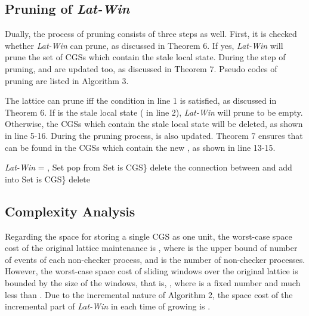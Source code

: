 \documentclass[12pt,journal,letterpaper,compsoc]{IEEEtran}
\begin{document}
\subsection{Pruning of {\it Lat-Win}}

Dually, the process of pruning consists of three steps as well. First, it is checked whether {\it Lat-Win} can prune, as discussed in Theorem 6. If yes, {\it Lat-Win} will prune the set of CGSs which contain the stale local state. During the step of pruning,  and  are updated too, as discussed in Theorem 7. Pseudo codes of pruning are listed in Algorithm 3.

The lattice can prune iff the condition in line 1 is satisfied, as discussed in Theorem 6. If  is the stale local state ( in line 2), {\it Lat-Win} will prune to be empty. Otherwise, the CGSs which contain the stale local state will be deleted, as shown in line 5-16. During the pruning process,  is also updated. Theorem 7 ensures that  can be found in the CGSs which contain the new , as shown in line 13-15.

\begin{algorithm}[htbp]
\SetAlgoVlined
{}
{
    \eIf{}
    {
        {\it Lat-Win} = , \;
    }
    {
        Set \;
        \While{}
        {
            pop  from \;
            Set  is CGS\}\;
            {
                delete the connection between  and \;
                \uIf{ \&\& }
                {
                    add  into \;
                }
                \ElseIf{}
                {
                    Set  is CGS\} 
                    \lIf{}
                    {
                        \;
                    }
                }
            }
            delete \;
        }
    }
}
\caption{\label{A:prune_lattice(C,k)}}
\end{algorithm}

\subsection{Complexity Analysis}
\label{sec:complexity analysis}

Regarding the space for storing a single CGS as one unit, the worst-case space cost of the original lattice maintenance is , where  is the upper bound of number of events of each non-checker process, and  is the number of non-checker processes. However, the worst-case space cost of sliding windows over the original lattice is bounded by the size  of the windows, that is, , where  is a fixed number and much less than . Due to the incremental nature of Algorithm 2, the space cost of the incremental part of {\it Lat-Win} in each time of growing is .
\end{document}
